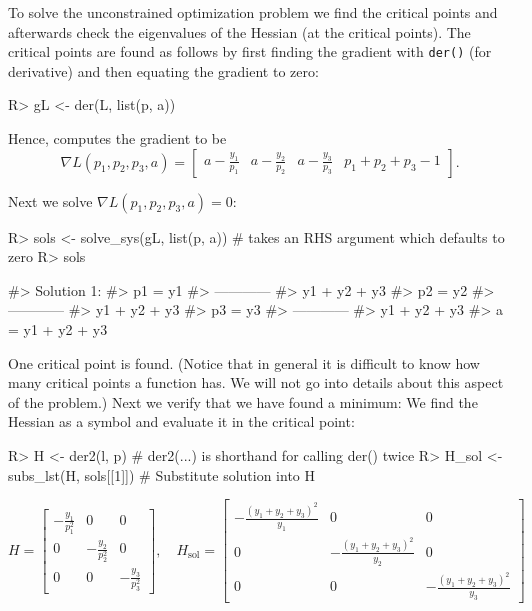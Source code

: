 To solve the unconstrained optimization problem we find the critical
points and afterwards check the eigenvalues of the Hessian (at the
critical points). The critical points are found as follows by first
finding the gradient with \texttt{der()} (for derivative) and then
equating the gradient to zero:

\begin{Schunk}
\begin{Sinput}
R> gL <- der(L, list(p, a))
\end{Sinput}
\end{Schunk}

Hence,  computes the gradient to be \[
  \nabla L (p_1, p_2, p_3, a) = \left[\begin{matrix}a - \frac{y_{1}}{p_{1}} & a - \frac{y_{2}}{p_{2}} & a - \frac{y_{3}}{p_{3}} & p_{1} + p_{2} + p_{3} - 1\end{matrix}\right] .
\]

Next we solve \(\nabla L (p_1, p_2, p_3, a) = 0\):

\begin{Schunk}
\begin{Sinput}
R> sols <- solve_sys(gL, list(p, a)) # takes an RHS argument which defaults to zero
R> sols
\end{Sinput}
\begin{Soutput}
#> Solution 1:
#>   p1 =       y1     
#>        ------------
#>        y1 + y2 + y3 
#>   p2 =       y2     
#>        ------------
#>        y1 + y2 + y3 
#>   p3 =       y3     
#>        ------------
#>        y1 + y2 + y3 
#>   a  =  y1 + y2 + y3
\end{Soutput}
\end{Schunk}

One critical point is found. (Notice that in general it is difficult to
know how many critical points a function has. We will not go into
details about this aspect of the problem.) Next we verify that we have
found a minimum: We find the Hessian as a symbol and evaluate it in the
critical point:

\begin{Schunk}
\begin{Sinput}
R> H <- der2(l, p) # der2(...) is shorthand for calling der() twice
R> H_sol <- subs_lst(H, sols[[1]]) # Substitute solution into H
\end{Sinput}
\end{Schunk}

\[
  H = \left[\begin{matrix}- \frac{y_{1}}{p_{1}^{2}} & 0 & 0\\0 & - \frac{y_{2}}{p_{2}^{2}} & 0\\0 & 0 & - \frac{y_{3}}{p_{3}^{2}}\end{matrix}\right], \quad
  H_{\text{sol}} = \left[\begin{matrix}- \frac{\left(y_{1} + y_{2} + y_{3}\right)^{2}}{y_{1}} & 0 & 0\\0 & - \frac{\left(y_{1} + y_{2} + y_{3}\right)^{2}}{y_{2}} & 0\\0 & 0 & - \frac{\left(y_{1} + y_{2} + y_{3}\right)^{2}}{y_{3}}\end{matrix}\right]
\]

